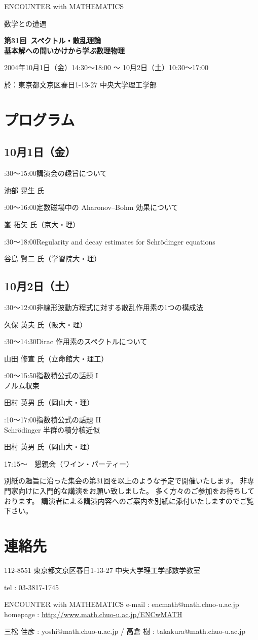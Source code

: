 \documentclass[uplatex,dvipdfmx]{jlreq}
\newcommand{\talk}[3]{%
\noindent
#1\quad #2\par
\hspace*{2em}#3\par\smallskip
}
\newcommand{\EwMnumber}{第31回}
\newcommand{\EwMtitle}{スペクトル・散乱理論\\[2mm]\large 基本解への問いかけから学ぶ数理物理}
\newcommand{\EwMdate}{2004年10月1日（金）14:30～18:00 ～ 10月2日（土）10:30～17:00}
\newcommand{\EwMplace}{東京都文京区春日1-13-27 中央大学理工学部}
\newcommand{\EwMtitleblock}{

\vspace*{-5mm}

\begin{center}

{\Large ENCOUNTER with MATHEMATICS}

\vspace{2mm}

{\large 数学との遭遇}

\vspace{4mm}

{\Large \bfseries \EwMnumber\ \EwMtitle}

\vspace{4mm}

\EwMdate

\vspace{2mm}

於：\EwMplace

\end{center}

\vspace{2mm}

}
\begin{document}
\EwMtitleblock


\section*{プログラム}

\subsection*{10月1日（金）}

\talk
{14:30～15:00}
{講演会の趣旨について}
{池部 晃生 氏}

\talk
{15:00～16:00}
{定数磁場中の Aharonov–Bohm 効果について}
{峯 拓矢 氏（京大・理）}

\talk
{16:30～18:00}
{Regularity and decay estimates for Schr\"odinger equations}
{谷島 賢二 氏（学習院大・理）}

\subsection*{10月2日（土）}

\talk
{10:30～12:00}
{非線形波動方程式に対する散乱作用素の1つの構成法}
{久保 英夫 氏（阪大・理）}

\talk
{13:30～14:30}
{Dirac 作用素のスペクトルについて}
{山田 修宣 氏（立命館大・理工）}

\talk
{15:00～15:50}
{指数積公式の話題 I\\[1mm]ノルム収束}
{田村 英男 氏（岡山大・理）}

\talk
{16:10～17:00}
{指数積公式の話題 II\\[1mm]Schr\"odinger 半群の積分核近似}
{田村 英男 氏（岡山大・理）}

\bigskip

17:15～　懇親会（ワイン・パーティー）


\bigskip

別紙の趣旨に沿った集会の第31回を以上のような予定で開催いたします。  
非専門家向けに入門的な講演をお願い致しました。  
多く方々のご参加をお待ちしております。  
講演者による講演内容へのご案内を別紙に添付いたしますのでご覧下さい。


\section*{連絡先}

112-8551 東京都文京区春日1-13-27 中央大学理工学部数学教室 

tel : 03-3817-1745  

ENCOUNTER with MATHEMATICS  
e-mail : encmath@math.chuo-u.ac.jp  
homepage : \url{http://www.math.chuo-u.ac.jp/ENCwMATH}  

三松 佳彦 : yoshi@math.chuo-u.ac.jp / 高倉 樹 : takakura@math.chuo-u.ac.jp
\end{document}

